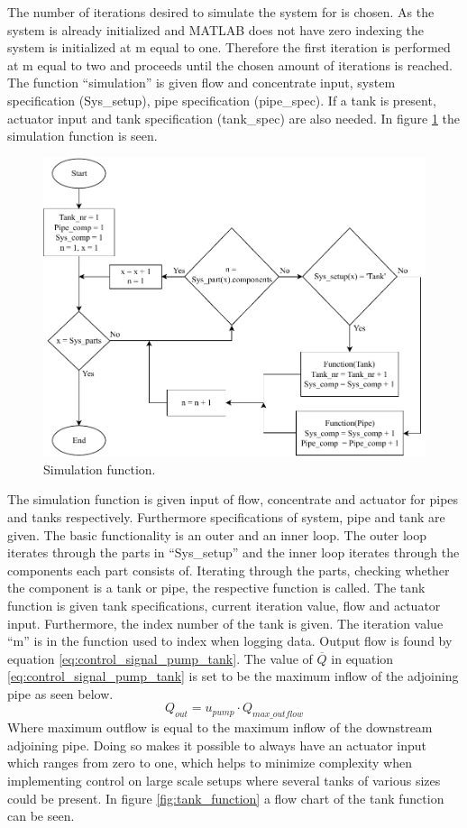The number of iterations desired to simulate the system for is chosen. As the system is already initialized and MATLAB does not have zero indexing the system is initialized at m equal to one. Therefore the first iteration is performed at m equal to two and proceeds until the chosen amount of iterations is reached. The function ``simulation'' is given flow and concentrate input, system specification (Sys\_setup), pipe specification (pipe\_spec). If a tank is present, actuator input and tank specification (tank\_spec) are also needed.
In figure \ref{fig:simu_chart} the simulation function is seen.
\begin{figure}[H]
\centering
\includegraphics[width=0.9 \textwidth]{report/simulation/pictures/simu_chart.pdf}
\caption{Simulation function.}
\label{fig:simu_chart}
\end{figure}

The simulation function is given input of flow, concentrate and actuator for pipes and tanks respectively. Furthermore specifications of system, pipe and tank are given. The basic functionality is an outer and an inner loop. The outer loop iterates through the parts in ``Sys\_setup'' and the inner loop iterates through the components each part consists of. Iterating through the parts, checking whether the component is a tank or pipe, the respective function is called. The tank function is given tank specifications, current iteration value, flow and actuator input. Furthermore, the index number of the tank is given. The iteration value ``m'' is in the function used to index when logging data. Output flow is found by equation \ref{eq:control_signal_pump_tank}. The value of $\overline Q$ in equation \ref{eq:control_signal_pump_tank} is set to be the maximum inflow of the adjoining pipe as seen below. 
\begin{equation}\label{eq:imp_tank_outflow}
	Q_{out} = u_{pump} \cdot Q_{max\_outflow}
\end{equation} 
Where maximum outflow is equal to the maximum inflow of the downstream adjoining pipe.
Doing so makes it possible to always have an actuator input which ranges from zero to one, which helps to minimize complexity when implementing control on large scale setups where several tanks of various sizes could be present. In figure \ref{fig:tank_function} a flow chart of the tank function can be seen.

